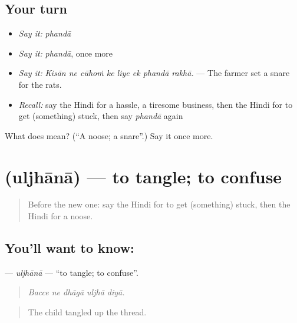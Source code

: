 \subsection*{Your turn}
\begin{itemize}
\raggedright
  \item \emph{Say it:} \emph{phandā}
  \item \emph{Say it:} \emph{phandā}, once more
  \item \emph{Say it:} \emph{Kisān ne cūhoṁ ke liye ek phandā rakhā.} — The farmer set a snare for the rats.
  \item \emph{Recall:} say the Hindi for a hassle, a tiresome business, then the Hindi for to get (something) stuck, then say \emph{phandā} again
\end{itemize}

\begin{tcolorbox}[breakable,colback=teal!4,colframe=teal!35!black,title={Before you move on}]
What does  mean? (\textquotedblleft{}A noose; a snare\textquotedblright{}.) Say it once more.
\end{tcolorbox}
\section[\texorpdfstring{\hi{उलझाना} (uljhānā)}{उलझाना (uljhānā)}]{ (uljhānā) — to tangle; to confuse}

\label{lesson:HI-C541-uljhana}



\begin{quote}
Before the new one: say the Hindi for to get (something) stuck, then the Hindi for a noose.
\end{quote}

\subsection*{You'll want to know: }
\textbf{} — \emph{uljhānā} — \textquotedblleft{}to tangle; to confuse\textquotedblright{}.

\begin{quote}
    
\end{quote}

\begin{quote}
\emph{Bacce ne dhāgā uljhā diyā.}
\end{quote}

\begin{quote}
The child tangled up the thread.
\end{quote}

